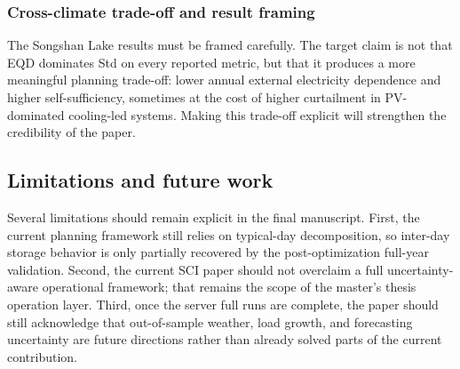 \subsubsection{Cross-climate trade-off and result framing}

The Songshan Lake results must be framed carefully. The target claim is not that EQD dominates Std on every reported metric, but that it produces a more meaningful planning trade-off: lower annual external electricity dependence and higher self-sufficiency, sometimes at the cost of higher curtailment in PV-dominated cooling-led systems. Making this trade-off explicit will strengthen the credibility of the paper.

\subsection{Limitations and future work}

Several limitations should remain explicit in the final manuscript. First, the current planning framework still relies on typical-day decomposition, so inter-day storage behavior is only partially recovered by the post-optimization full-year validation. Second, the current SCI paper should not overclaim a full uncertainty-aware operational framework; that remains the scope of the master's thesis operation layer. Third, once the server full runs are complete, the paper should still acknowledge that out-of-sample weather, load growth, and forecasting uncertainty are future directions rather than already solved parts of the current contribution.
